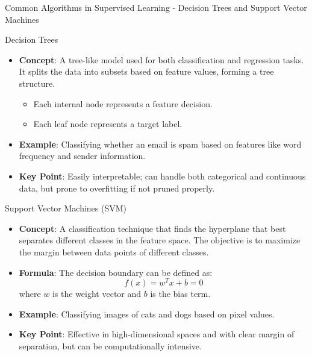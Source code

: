 \documentclass[aspectratio=169]{beamer}
\begin{document}
\begin{frame}[fragile]{Common Algorithms in Supervised Learning - Decision Trees and Support Vector Machines}
    \begin{block}{Decision Trees}
        \begin{itemize}
            \item \textbf{Concept}: A tree-like model used for both classification and regression tasks. It splits the data into subsets based on feature values, forming a tree structure.
            \begin{itemize}
                \item Each internal node represents a feature decision.
                \item Each leaf node represents a target label.
            \end{itemize}
            \item \textbf{Example}: Classifying whether an email is spam based on features like word frequency and sender information.
            \item \textbf{Key Point}: Easily interpretable; can handle both categorical and continuous data, but prone to overfitting if not pruned properly.
        \end{itemize}
    \end{block}

    \begin{block}{Support Vector Machines (SVM)}
        \begin{itemize}
            \item \textbf{Concept}: A classification technique that finds the hyperplane that best separates different classes in the feature space. The objective is to maximize the margin between data points of different classes.
            \item \textbf{Formula}: The decision boundary can be defined as:
            \begin{equation}
            f(x) = w^T x + b = 0
            \end{equation}
            where \( w \) is the weight vector and \( b \) is the bias term.
            \item \textbf{Example}: Classifying images of cats and dogs based on pixel values.
            \item \textbf{Key Point}: Effective in high-dimensional spaces and with clear margin of separation, but can be computationally intensive.
        \end{itemize}
    \end{block}
\end{frame}
\end{document}
